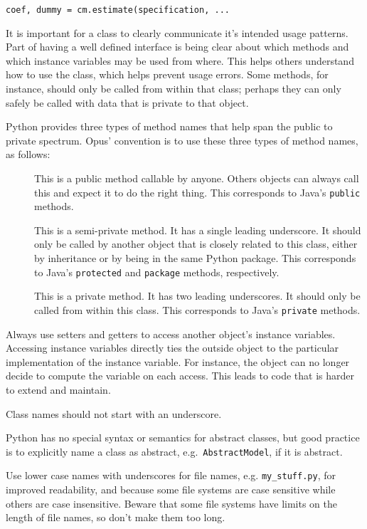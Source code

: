 \begin{verbatim}
coef, dummy = cm.estimate(specification, ... 
\end{verbatim} 

It is important for a class to clearly communicate it's intended usage
patterns.  Part of having a well defined interface is being clear about which
methods and which instance variables may be used from where.  This helps others
understand how to use the class, which helps prevent usage errors.  Some
methods, for instance, should only be called from within that class; perhaps
they can only safely be called with data that is private to that object.

Python provides three types of method names that help span the public to
private spectrum.  Opus' convention is to use these three types of method
names, as follows:

\begin{description}
\item[] This is a public method callable by anyone.  Others
objects can always call this and expect it to do the right thing.  This
corresponds to Java's \verb|public| methods.
\item[] This is a semi-private method.  It has a single leading
underscore.  It should only be called by another object that is closely related
to this class, either by inheritance or by being in the same Python package.
This corresponds to Java's \verb|protected| and \verb|package| methods,
respectively.
\item[] This is a private method.  It has two leading
underscores.  It should only be called from within this class.  This
corresponds to Java's \verb|private| methods.
\end{description}

Always use setters and getters to access another object's instance variables.
Accessing instance variables directly ties the outside object to the particular
implementation of the instance variable. For instance, the object can no
longer decide to compute the variable on each access.  This leads to code that
is harder to extend and maintain.

Class names should not start with an underscore.

Python has no special syntax or semantics for abstract classes, but good practice is to
explicitly name a class as abstract, e.g.\ \verb|AbstractModel|, if it is
abstract.

Use lower case names with underscores for file names, e.g.
\verb|my_stuff.py|, for improved readability, and because some
file systems are case sensitive while others are case insensitive.
Beware that some file systems have limits on the length of file
names, so don't make them too long.

